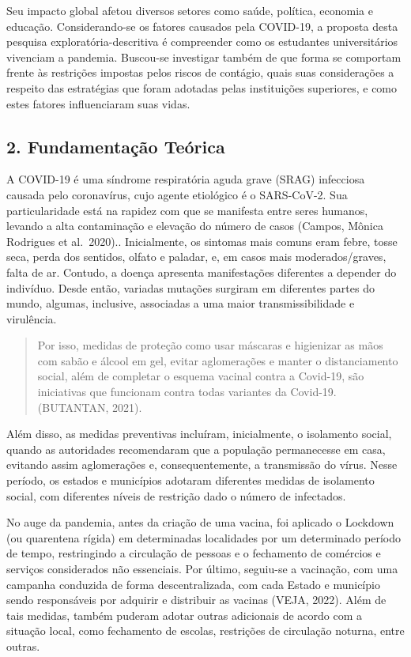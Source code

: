\documentclass[
]{article}
\begin{document}
Seu impacto global afetou diversos setores como saúde, política,
economia e educação. Considerando-se os fatores causados pela COVID-19,
a proposta desta pesquisa exploratória-descritiva é compreender como os
estudantes universitários vivenciam a pandemia. Buscou-se investigar
também de que forma se comportam frente às restrições impostas pelos
riscos de contágio, quais suas considerações a respeito das estratégias
que foram adotadas pelas instituições superiores, e como estes fatores
influenciaram suas vidas.

\hypertarget{fundamentauxe7uxe3o-teuxf3rica}{%
\subsection{2. Fundamentação
Teórica}\label{fundamentauxe7uxe3o-teuxf3rica}}

A COVID-19 é uma síndrome respiratória aguda grave (SRAG) infecciosa
causada pelo coronavírus, cujo agente etiológico é o SARS-CoV-2. Sua
particularidade está na rapidez com que se manifesta entre seres
humanos, levando a alta contaminação e elevação do número de casos
(Campos, Mônica Rodrigues et al.~2020).. Inicialmente, os sintomas mais
comuns eram febre, tosse seca, perda dos sentidos, olfato e paladar, e,
em casos mais moderados/graves, falta de ar. Contudo, a doença apresenta
manifestações diferentes a depender do indivíduo. Desde então, variadas
mutações surgiram em diferentes partes do mundo, algumas, inclusive,
associadas a uma maior transmissibilidade e virulência.

\begin{quote}
Por isso, medidas de proteção como usar máscaras e higienizar as mãos
com sabão e álcool em gel, evitar aglomerações e manter o distanciamento
social, além de completar o esquema vacinal contra a Covid-19, são
iniciativas que funcionam contra todas variantes da Covid-19. (BUTANTAN,
2021).
\end{quote}

Além disso, as medidas preventivas incluíram, inicialmente, o isolamento
social, quando as autoridades recomendaram que a população permanecesse
em casa, evitando assim aglomerações e, consequentemente, a transmissão
do vírus. Nesse período, os estados e municípios adotaram diferentes
medidas de isolamento social, com diferentes níveis de restrição dado o
número de infectados.

No auge da pandemia, antes da criação de uma vacina, foi aplicado o
Lockdown (ou quarentena rígida) em determinadas localidades por um
determinado período de tempo, restringindo a circulação de pessoas e o
fechamento de comércios e serviços considerados não essenciais. Por
último, seguiu-se a vacinação, com uma campanha conduzida de forma
descentralizada, com cada Estado e município sendo responsáveis por
adquirir e distribuir as vacinas (VEJA, 2022). Além de tais medidas,
também puderam adotar outras adicionais de acordo com a situação local,
como fechamento de escolas, restrições de circulação noturna, entre
outras.
\end{document}
